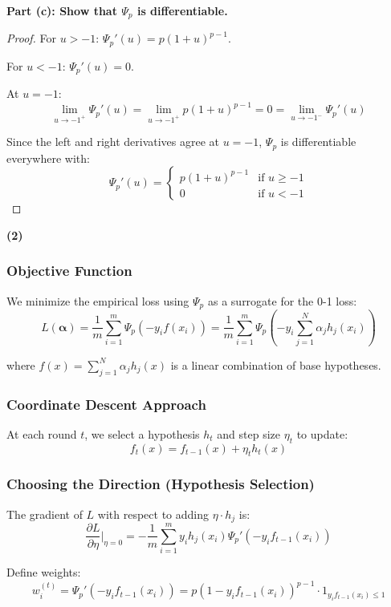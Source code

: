 \documentclass[letterpaper, 11pt]{article}
\newcommand{\1}{\mathds{1}}	%
\theoremstyle{definition}
\begin{document}
\textbf{Part (c): Show that $\Psi_p$ is differentiable.}

\begin{proof}
For $u > -1$: $\Psi_p'(u) = p(1+u)^{p-1}$.

For $u < -1$: $\Psi_p'(u) = 0$.

At $u = -1$: 
$$\lim_{u \to -1^+} \Psi_p'(u) = \lim_{u \to -1^+} p(1+u)^{p-1} = 0 = \lim_{u \to -1^-} \Psi_p'(u)$$

Since the left and right derivatives agree at $u = -1$, $\Psi_p$ is differentiable everywhere with:
$$\Psi_p'(u) = \begin{cases} p(1+u)^{p-1} & \text{if } u \geq -1 \\ 0 & \text{if } u < -1 \end{cases}$$
\end{proof}

\textbf{(2)}

\subsubsection*{Objective Function}

We minimize the empirical loss using $\Psi_p$ as a surrogate for the 0-1 loss:
$$L(\boldsymbol{\alpha}) = \frac{1}{m} \sum_{i=1}^{m} \Psi_p\left(-y_i f(x_i)\right) = \frac{1}{m} \sum_{i=1}^{m} \Psi_p\left(-y_i \sum_{j=1}^{N} \alpha_j h_j(x_i)\right)$$

where $f(x) = \sum_{j=1}^{N} \alpha_j h_j(x)$ is a linear combination of base hypotheses.

\subsubsection*{Coordinate Descent Approach}

At each round $t$, we select a hypothesis $h_t$ and step size $\eta_t$ to update:
$$f_t(x) = f_{t-1}(x) + \eta_t h_t(x)$$

\subsubsection*{Choosing the Direction (Hypothesis Selection)}

The gradient of $L$ with respect to adding $\eta \cdot h_j$ is:
$$\frac{\partial L}{\partial \eta}\bigg|_{\eta=0} = -\frac{1}{m} \sum_{i=1}^{m} y_i h_j(x_i) \Psi_p'\left(-y_i f_{t-1}(x_i)\right)$$

Define weights:
$$w_i^{(t)} = \Psi_p'\left(-y_i f_{t-1}(x_i)\right) = p\left(1 - y_i f_{t-1}(x_i)\right)^{p-1} \cdot 1_{y_i f_{t-1}(x_i) \leq 1}$$
\end{document}
